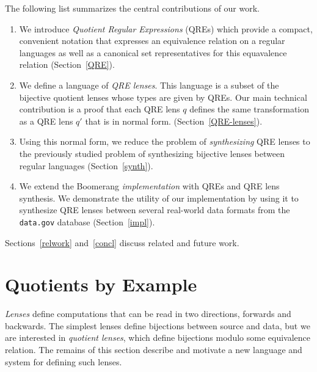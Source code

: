 \documentclass[acmsmall,review,anonymous]{acmart}\settopmatter{printfolios=true,printccs=false,printacmref=false}
\begin{document}
The following list summarizes the central contributions of our work.
\begin{enumerate}
  \item We introduce {\em Quotient Regular Expressions} (QREs)
  which provide a compact, convenient notation that expresses an equivalence
  relation on a regular languages as well as a canonical set representatives
  for this equavalence relation (Section~\ref{QRE}).
  \item We define a language of {\em QRE lenses}.  This language is
  a subset of the bijective quotient
  lenses whose types are given by QREs. Our main technical contribution
  is a proof that each QRE lens $q$ defines the same transformation as a
  QRE lens $q'$ that is in normal form. (Section~\ref{QRE-lenses}).
  \item Using this normal form, we reduce the problem of {\em synthesizing}
  QRE lenses to the previously studied problem of synthesizing bijective lenses
  between regular languages (Section~\ref{synth}).
  \item We extend the Boomerang {\em implementation} with QREs
  and QRE lens synthesis.  We demonstrate the utility of our
  implementation by using it to
  synthesize QRE lenses between several real-world data formats from the
  {\tt data.gov} database (Section~\ref{impl}).
\end{enumerate}
Sections~\ref{relwork} and~\ref{concl} discuss related and future work.

\section{Quotients by Example}
\label{sec:example}


\emph{Lenses} define computations that can be read in two directions, forwards and
backwards.  The simplest lenses define bijections between source and
data, but we are interested in \emph{quotient lenses}, which define
bijections modulo some equivalence relation.  The remains of this section
describe and motivate a new language and system for defining such lenses.
\end{document}
